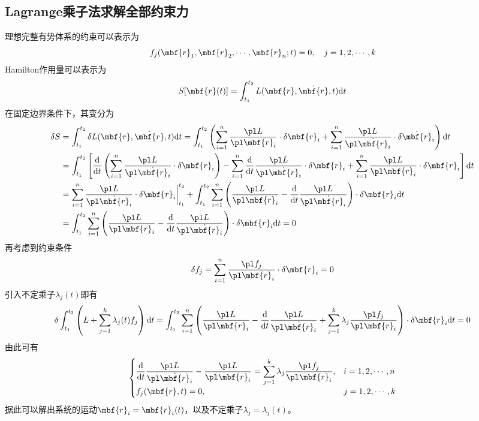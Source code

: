 \subsection{Lagrange乘子法求解全部约束力}

理想完整有势体系的约束可以表示为
\begin{equation}
	f_j(\mbf{r}_1,\mbf{r}_2,\cdots,\mbf{r}_n;t) = 0,\quad j = 1,2,\cdots,k
\end{equation}
Hamilton作用量可以表示为
\begin{equation*}
	S[\mbf{r}(t)] = \int_{t_1}^{t_2} L(\mbf{r},\dot{\mbf{r}},t) \mathrm{d} t
\end{equation*}
在固定边界条件下，其变分为
\begin{align*}
	\delta S & = \int_{t_1}^{t_2} \delta L(\mbf{r},\dot{\mbf{r}},t) \mathrm{d} t = \int_{t_1}^{t_2} \left(\sum_{i=1}^n \frac{\pl L}{\pl \mbf{r}_i} \cdot \delta \mbf{r}_i + \sum_{i=1}^n \frac{\pl L}{\pl \dot{\mbf{r}}_i} \cdot \delta \dot{\mbf{r}}_i\right) \mathrm{d} t \\
	& = \int_{t_1}^{t_2} \left[\frac{\mathrm{d}}{\mathrm{d} t} \left(\sum_{i=1}^n \frac{\pl L}{\pl \dot{\mbf{r}}_i} \cdot \delta \mbf{r}_i\right) - \sum_{i=1}^n \frac{\mathrm{d}}{\mathrm{d} t} \frac{\pl L}{\pl \dot{\mbf{r}}_i} \cdot \delta \mbf{r}_i + \sum_{i=1}^n \frac{\pl L}{\pl \mbf{r}_i} \cdot \delta \mbf{r}_i\right] \mathrm{d} t \\
	& = \sum_{i=1}^n \frac{\pl L}{\pl \dot{\mbf{r}}_i} \cdot \delta \mbf{r}_i \bigg|_{t_1}^{t_2} + \int_{t_1}^{t_2} \sum_{i=1}^n \left(\frac{\pl L}{\pl \mbf{r}_i} - \frac{\mathrm{d}}{\mathrm{d} t} \frac{\pl L}{\pl \dot{\mbf{r}}_i}\right) \cdot \delta \mbf{r}_i \mathrm{d} t \\
	& = \int_{t_1}^{t_2} \sum_{i=1}^n \left(\frac{\pl L}{\pl \mbf{r}_i} - \frac{\mathrm{d}}{\mathrm{d} t} \frac{\pl L}{\pl \dot{\mbf{r}}_i}\right) \cdot \delta \mbf{r}_i \mathrm{d} t = 0
\end{align*}
再考虑到约束条件
\begin{equation*}
	\delta f_j = \sum_{i=1}^n \frac{\pl f_j}{\pl \mbf{r}_i} \cdot \delta \mbf{r}_i = 0
\end{equation*}
引入不定乘子$\lambda_j(t)$即有
\begin{equation}
	\delta \int_{t_1}^{t_2} \left(L + \sum_{j=1}^k \lambda_j(t) f_j\right) \mathrm{d} t = \int_{t_1}^{t_2} \sum_{i=1}^n \left(\frac{\pl L}{\pl \mbf{r}_i} - \frac{\mathrm{d}}{\mathrm{d} t} \frac{\pl L}{\pl \dot{\mbf{r}}_i} + \sum_{j=1}^k \lambda_j \frac{\pl f_j}{\pl \mbf{r}_i}\right) \cdot \delta \mbf{r}_i \mathrm{d} t = 0
\end{equation}
由此可有
\begin{equation}
	\begin{cases}
		\displaystyle \frac{\mathrm{d}}{\mathrm{d} t} \frac{\pl L}{\pl \dot{\mbf{r}}_i} - \frac{\pl L}{\pl \mbf{r}_i} = \sum_{j=1}^k \lambda_j \frac{\pl f_j}{\pl \mbf{r}_i},& i = 1,2,\cdots,n \\
		\displaystyle f_j(\mbf{r},t) = 0,& j=1,2,\cdots,k
	\end{cases}
	\label{完整有势系的Lagrange乘子法}
\end{equation}
据此可以解出系统的运动$\mbf{r}_i = \mbf{r}_i(t)$，以及不定乘子$\lambda_j = \lambda_j(t)$。

